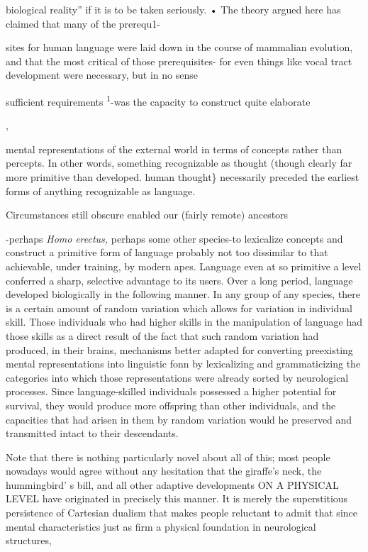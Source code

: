 {\textquotedbl}biological reality'' if it is to be taken seriously. • The theory argued here has claimed that many of the prerequ1{}-

sites for human language were laid down in the course of mammalian evolution, and that the most critical of those prerequisites- for even things like vocal tract development were necessary, but in no sense

sufficient requirements \textsuperscript{1}{}-was the capacity to construct quite elaborate 

,

mental representations of the external world in terms of concepts rather than percepts. In other words, something recognizable as thought (though clearly far more primitive than developed. human thought\} necessarily preceded the earliest forms of anything recognizable as language.

Circumstances still obscure enabled our (fairly remote) ancestors

{}-perhaps \textit{Homo} \textit{erectus,} perhaps some other species{}-to lexicalize concepts and construct a primitive form of language probably not too dissimilar to that achievable, under training, by modern apes. Language even at so primitive a level conferred a sharp, selective advantage to its users. Over a long period, language developed biologically in the follow\-ing manner. In any group of any species, there is a certain amount of random variation which allows for variation in individual skill. Those individuals who had higher skills in the manipulation of language had those skills as a direct result of the fact that such random variation had produced, in their brains, mechanisms better adapted for converting preexisting mental representations into linguistic fonn by lexicalizing and grammaticizing the categories into which those representations were already sorted by neurological processes. Since language-skilled individuals possessed a higher potential for survival, they would pro\-duce more offspring than other individuals, and the capacities that had arisen in them by random variation would he preserved and trans\-mitted intact to their descendants.

Note that there is nothing particularly novel about all of this; most people nowadays would agree without any hesitation that the giraffe's neck, the hummingbird' s bill, and all other adaptive develop\-ments ON A PHYSICAL LEVEL have originated in precisely this manner. It is merely the superstitious persistence of Cartesian dualism that makes people reluctant to admit that since mental characteristics just as firm a physical foundation in neurological structures,

